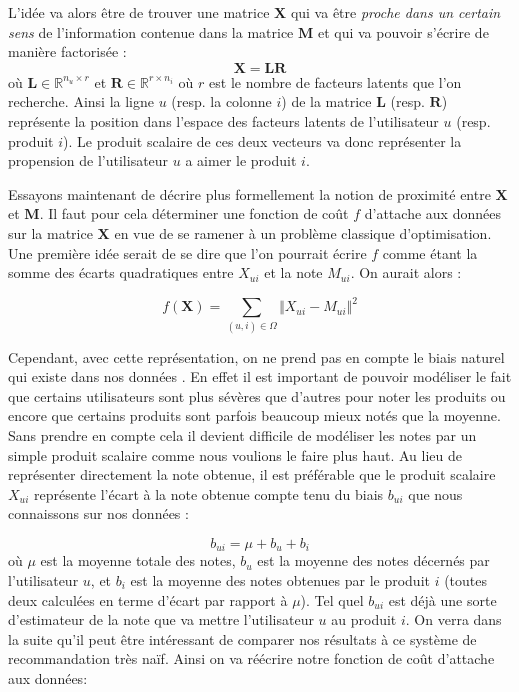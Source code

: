 \documentclass[10pt,a4paper]{article}
\begin{document}
L'idée va alors être de trouver une matrice $\textbf{X}$ qui va être \textit{proche dans un certain sens} de l'information contenue dans la matrice $\textbf{M}$ et qui va pouvoir s'écrire de manière factorisée :
$$ \textbf{X} = \mathbf{LR} $$
où $\mathbf{L} \in \mathbb{R}^{n_u\times r}$ et $\mathbf{R} \in \mathbb{R}^{r\times n_i}$ où $r$ est le nombre de facteurs latents que l'on recherche. Ainsi la ligne $u$ (resp. la colonne $i$) de la matrice $\mathbf{L}$ (resp. $\mathbf{R}$) représente la position dans l'espace des facteurs latents de l'utilisateur $u$ (resp. produit $i$). Le produit scalaire de ces deux vecteurs va donc représenter la propension de l'utilisateur $u$ a aimer le produit $i$. 

Essayons maintenant de décrire plus formellement la notion de proximité entre $\mathbf{X}$ et $\textbf{M}$. Il faut pour cela déterminer une fonction de coût $f$ d'attache aux données sur la matrice $\textbf{X}$ en vue de se ramener à un problème classique d'optimisation. Une première idée serait de se dire que l'on pourrait écrire $f$ comme étant la somme des écarts quadratiques entre $X_{ui}$ et la note $M_{ui}$. On aurait alors :

$$ f(\textbf{X}) = \sum_{(u,i)\in\Omega}\Vert X_{ui}-M_{ui} \Vert^2 $$

Cependant, avec cette représentation, on ne prend pas en compte le biais naturel qui existe dans nos données \cite{koren}. En effet il est important de pouvoir modéliser le fait que certains utilisateurs sont plus sévères que d'autres pour noter les produits ou encore que certains produits sont parfois beaucoup mieux notés que la moyenne. Sans prendre en compte cela il devient difficile de modéliser les notes par un simple produit scalaire comme nous voulions le faire plus haut. Au lieu de représenter directement la note obtenue, il est préférable que le produit scalaire $X_{ui}$ représente l'écart à la note obtenue compte tenu du biais $b_{ui}$ que nous connaissons sur nos données :

$$b_{ui} = \mu + b_u  + b_i $$ 
où $\mu$ est la moyenne totale des notes, $b_u$ est la moyenne des notes décernés par l'utilisateur $u$, et $b_i$ est la moyenne des notes obtenues par le produit $i$ (toutes deux calculées en terme d'écart par rapport à $\mu$). Tel quel $b_{ui}$ est déjà une sorte d'estimateur de la note que va mettre l'utilisateur $u$ au produit $i$. On verra dans la suite qu'il peut être intéressant de comparer nos résultats à ce système de recommandation très naïf. Ainsi on va réécrire notre fonction de coût d'attache aux données:
\end{document}
